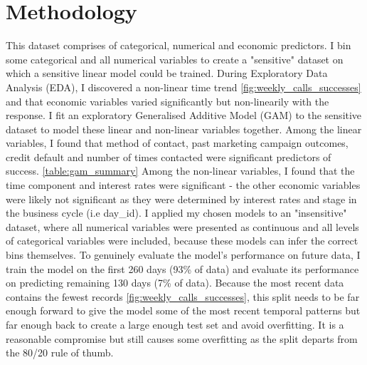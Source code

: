 \documentclass[9pt]{article}
\begin{document}
\vspace{-0.25cm}
\section{Methodology}
\vspace{-0.25cm}
This dataset comprises of categorical, numerical and economic predictors. I bin some categorical and all numerical variables to create a "sensitive" dataset on which a sensitive linear model could be trained. During Exploratory Data Analysis (EDA), I discovered a non-linear time trend \ref{fig:weekly_calls_successes} and that economic variables varied significantly but non-linearily with the response. I fit an exploratory Generalised Additive Model (GAM) to the sensitive dataset to model these linear and non-linear variables together. Among the linear variables, I found that method of contact, past marketing campaign outcomes, credit default and number of times contacted were significant predictors of success. \ref{table:gam_summary} Among the non-linear variables, I found that the time component and interest rates were significant - the other economic variables were likely not significant as they were determined by interest rates and stage in the business cycle (i.e day\_id). I applied my chosen models to an "insensitive" dataset, where all numerical variables were presented as continuous and all levels of categorical variables were included, because these models can infer the correct bins themselves. To genuinely evaluate the model's performance on future data, I train the model on the first 260 days (93\% of data) and evaluate its performance on predicting remaining 130 days (7\% of data). Because the most recent data contains the fewest records \ref{fig:weekly_calls_successes}, this split needs to be far enough forward to give the model some of the most recent temporal patterns but far enough back to create a large enough test set and avoid overfitting. It is a reasonable compromise but still causes some overfitting as the split departs from the 80/20 rule of thumb.
\end{document}
